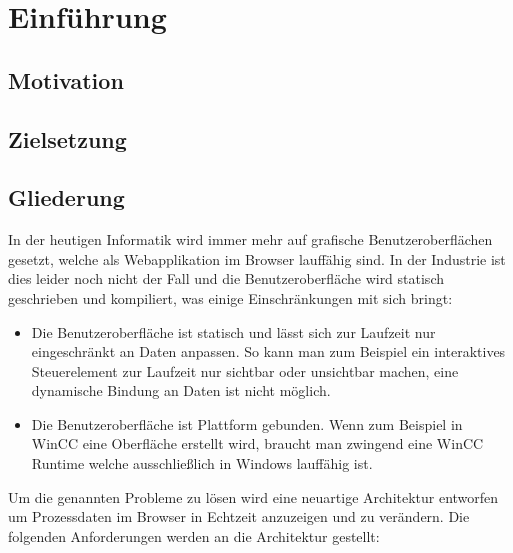 \chapter{Einführung}
\section{Motivation}
\section{Zielsetzung}
\section{Gliederung}


In der heutigen Informatik wird immer mehr auf grafische Benutzeroberflächen gesetzt, welche als Webapplikation im Browser lauffähig sind.
In der Industrie ist dies leider noch nicht der Fall und die Benutzeroberfläche wird statisch geschrieben und kompiliert, was einige Einschränkungen mit sich bringt:
\begin{itemize}
    \item Die Benutzeroberfläche ist statisch und lässt sich zur Laufzeit nur eingeschränkt an Daten anpassen. So kann man zum Beispiel ein interaktives Steuerelement zur Laufzeit nur sichtbar oder unsichtbar machen, eine dynamische Bindung an Daten ist nicht möglich.
    \item Die Benutzeroberfläche ist Plattform gebunden. Wenn zum Beispiel in WinCC eine Oberfläche erstellt wird, braucht man zwingend eine WinCC Runtime welche ausschließlich in Windows lauffähig ist.
\end{itemize}
Um die genannten Probleme zu lösen wird eine neuartige Architektur entworfen um Prozessdaten im Browser in Echtzeit anzuzeigen und zu verändern.
Die folgenden Anforderungen werden an die Architektur gestellt:
